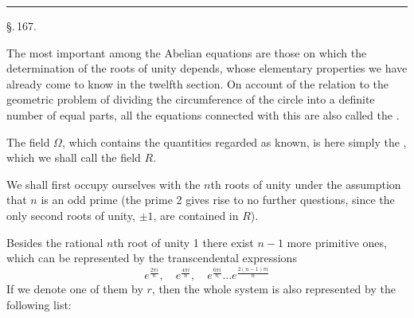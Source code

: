 \begin{center}


\rule{3cm}{0.4pt}

\S.\,167.

\end{center}

The most important among the Abelian equations are those on which the determination of the roots of unity depends, whose elementary properties we have already come to know in the twelfth section. On account of the relation to the geometric problem of dividing the circumference of the circle into a definite number of equal parts, all the equations connected with this are also called the .

The field $\Omega$, which contains the quantities regarded as known, is here simply the , which we shall call the field $R$.

We shall first occupy ourselves with the $n$th roots of unity under the assumption that $n$ is an odd prime (the prime 2 gives rise to no further questions, since the only second roots of unity, $\pm 1$, are contained in $R$).

Besides the rational $n$th root of unity 1 there exist $n - 1$ more primitive ones, which can be represented by the transcendental expressions
\[
e^{\frac{2\pi i}{n}}, \quad e^{\frac{4\pi i}{n}}, \quad e^{\frac{6\pi i}{n}} \dots e^{\frac{2(n-1)\pi i}{n}}
\]
If we denote one of them by $r$, then the whole system is also represented by the following list:
